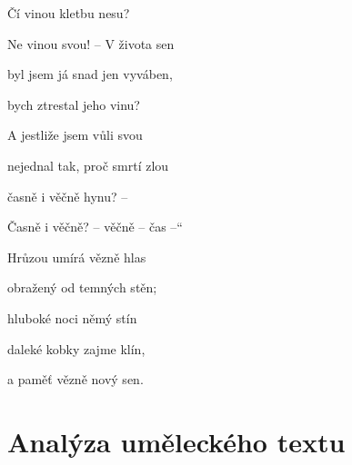 \documentclass[11pt]{article}
\begin{document}
Čí vinou kletbu nesu?

Ne vinou svou! – V života sen

byl jsem já snad jen vyváben,

bych ztrestal jeho vinu?

A jestliže jsem vůli svou

nejednal tak, proč smrtí zlou

časně i věčně hynu? –

Časně i věčně? – věčně – čas –“

Hrůzou umírá vězně hlas

obražený od temných stěn;

hluboké noci němý stín

daleké kobky zajme klín,

a paměť vězně nový sen.
    \section*{Analýza uměleckého textu}
\end{document}
